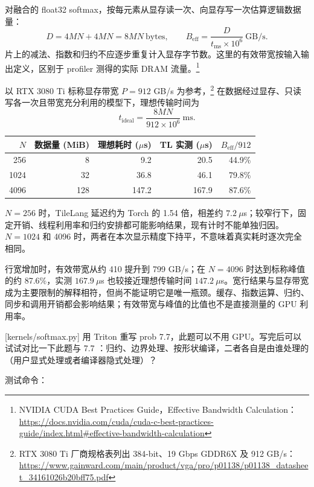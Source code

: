 \documentclass[11pt,a4paper,fontset=none]{ctexart}
\begin{document}
\begin{tcolorbox}[title={7.7 有效带宽、理想下界与结论},breakable]
对融合的 float32 softmax，按每元素从显存读一次、向显存写一次估算逻辑数据量：
\[
D=4MN+4MN=8MN\ \text{bytes},\qquad
B_{\mathrm{eff}}=\frac{D}{t_{\mathrm{ms}}\times10^6}\ \text{GB/s}.
\]
片上的减法、指数和归约不应逐步重复计入显存字节数。这里的有效带宽按输入输出定义，区别于 profiler 测得的实际 DRAM 流量。\footnote{NVIDIA CUDA Best Practices Guide，Effective Bandwidth Calculation：\url{https://docs.nvidia.com/cuda/cuda-c-best-practices-guide/index.html\#effective-bandwidth-calculation}}

以 RTX 3080 Ti 标称显存带宽 $P=912$ GB/s 为参考，\footnote{RTX 3080 Ti 厂商规格表列出 384-bit、19 Gbps GDDR6X 及 912 GB/s：\url{https://www.gainward.com/main/product/vga/pro/p01138/p01138_datasheet_34161026b20bff75.pdf}} 在数据经过显存、只读写各一次且带宽充分利用的模型下，理想传输时间为
\[
t_{\mathrm{ideal}}=\frac{8MN}{912\times10^6}\ \text{ms}.
\]
\begin{center}\small
\begin{tabular}{@{}rrrrr@{}}
\toprule
$N$ & 数据量 (MiB) & 理想耗时 ($\mu$s) & TL 实测 ($\mu$s) & $B_{\mathrm{eff}}/912$ \\
\midrule
256  & 8   & 9.2   & 20.5  & 44.9\% \\
1024 & 32  & 36.8  & 46.1  & 79.8\% \\
4096 & 128 & 147.2 & 167.9 & 87.6\% \\
\bottomrule
\end{tabular}
\end{center}

$N=256$ 时，TileLang 延迟约为 Torch 的 1.54 倍，相差约 $7.2\ \mu$s；较窄行下，固定开销、线程利用率和归约安排都可能影响结果，现有计时不能单独归因。$N=1024$ 和 4096 时，两者在本次显示精度下持平，不意味着真实耗时逐次完全相同。

行宽增加时，有效带宽从约 410 提升到 799 GB/s；在 $N=4096$ 时达到标称峰值的约 87.6\%，实测 $167.9\ \mu$s 也较接近理想传输时间 $147.2\ \mu$s。宽行结果与显存带宽成为主要限制的解释相符，但尚不能证明它是唯一瓶颈。缓存、指数运算、归约、同步和调用开销都会影响结果；有效带宽与峰值的比值也不是直接测量的 GPU 利用率。
\end{tcolorbox}

[kernels/softmax.py]
用 Triton 重写 prob 7.7，此题可以不用 GPU。写完后可以试试对比一下此题与 7.7 ：归约、边界处理、按形状编译，二者各自是由谁处理的（用户显式处理或者编译器隐式处理）？

测试命令：
\end{document}
